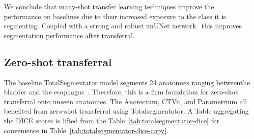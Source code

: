 \documentclass[11pt,twoside]{report}
\begin{document}
We conclude that many-shot transfer learning techniques improve the performance on baselines due to their increased exposure to the class it is segmenting. Coupled with a strong and robust nnUNet network~\cite{isensee2024nnunet, nnunet} this improves segmentation performance after transferral.

\subsection{Zero-shot transferral}\label{sec:totseg-zero-shot-transfer}

The baseline TotalSegmentator model segments 24 anatomies ranging betweenthe bladder and the esophagus~\cite{totalsegmentor-git}. Therefore, this is a firm foundation for zero-shot transferral onto unseen anatomies. The Anorectum, CTVn, and Parametrium all benefited from zero-shot transferral using Totalsegmentator. A Table aggregating the DICE scores is lifted from the Table~\ref{tab:totalsegmentator-dice} for convenience in Table~\ref{tab:totalsegmentator-dice-copy}.

\begin{table}[h!]
  \centering
  \caption{DICE scores across each anatomy. Bold values highlight the best model for the anaotmy.}
  \label{tab:totalsegmentator-dice-copy}
\end{table}
\end{document}
